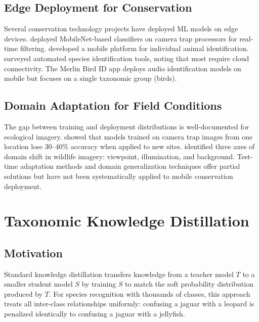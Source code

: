 \documentclass[11pt,a4paper]{article}
\begin{document}
\subsection{Edge Deployment for Conservation}

Several conservation technology projects have deployed ML models on edge devices.
\citet{ahumada2020wildlife} deployed MobileNet-based classifiers on camera trap processors for real-time filtering.
\citet{bergerwolf2017wildbook} developed a mobile platform for individual animal identification.
\citet{terry2020automated} surveyed automated species identification tools, noting that most require cloud connectivity.
The Merlin Bird ID app \citep{wood2011ebird} deploys audio identification models on mobile but focuses on a single taxonomic group (birds).

\subsection{Domain Adaptation for Field Conditions}

The gap between training and deployment distributions is well-documented for ecological imagery.
\citet{beery2018recognition} showed that models trained on camera trap images from one location lose 30--40\% accuracy when applied to new sites.
\citet{schneider2020three} identified three axes of domain shift in wildlife imagery: viewpoint, illumination, and background.
Test-time adaptation methods \citep{wang2022continual} and domain generalization techniques \citep{zhou2022domain} offer partial solutions but have not been systematically applied to mobile conservation deployment.

\section{Taxonomic Knowledge Distillation}
\label{sec:distillation}

\subsection{Motivation}

Standard knowledge distillation \citep{hinton2015distilling} transfers knowledge from a teacher model $T$ to a smaller student model $S$ by training $S$ to match the soft probability distribution produced by $T$.
For species recognition with thousands of classes, this approach treats all inter-class relationships uniformly: confusing a jaguar with a leopard is penalized identically to confusing a jaguar with a jellyfish.
\end{document}
